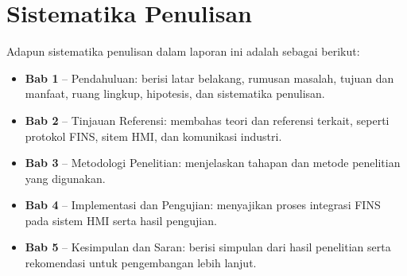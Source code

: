\section{Sistematika Penulisan}
Adapun sistematika penulisan dalam laporan ini adalah sebagai berikut:
\begin{itemize}
    \item \textbf{Bab 1} – Pendahuluan: berisi latar belakang, rumusan masalah, tujuan dan manfaat, ruang lingkup, hipotesis, dan sistematika penulisan.
    \item \textbf{Bab 2} – Tinjauan Referensi: membahas teori dan referensi terkait, seperti protokol FINS, sitem HMI, dan komunikasi industri.
    \item \textbf{Bab 3} – Metodologi Penelitian: menjelaskan tahapan dan metode penelitian yang digunakan.
    \item \textbf{Bab 4} – Implementasi dan Pengujian: menyajikan proses integrasi FINS pada sistem HMI serta hasil pengujian.
    \item \textbf{Bab 5} – Kesimpulan dan Saran: berisi simpulan dari hasil penelitian serta rekomendasi untuk pengembangan lebih lanjut.
\end{itemize}
